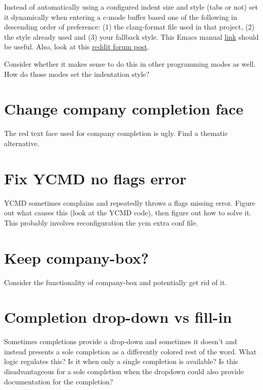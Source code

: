 \documentclass{default}
\begin{document}
Instead of automatically using a configured indent size and style (tabs or not) set it dynamically
when entering a c-mode buffer based one of the following in descending order of preference: (1) the
clang-format file used in that project, (2) the style already used and (3) your fallback style. This
Emacs manual
\href{https://www.gnu.org/software/emacs/manual/html_node/emacs/C-Indent.html#C-Indent}{link} should
be useful. Also, look at this
\href{https://www.reddit.com/r/emacs/comments/7uq9w1/replace_emacs_c_autoformatting_with_clangformat/dtmbq1j?utm_source=share&utm_medium=web2x}{reddit
  forum post}.

Consider whether it makes sense to do this in other programming modes as well. How do those modes
set the indentation style?

\section{Change company completion face}

The red text face used for company completion is ugly. Find a thematic alternative.

\section{Fix YCMD no flags error}

YCMD sometimes complains and repeatedly throws a flags missing error. Figure out what causes this
(look at the YCMD code), then figure out how to solve it. This probably involves reconfiguration the
ycm extra conf file.

\section{Keep company-box?}

Consider the functionality of company-box and potentially get rid of it.

\section{Completion drop-down vs fill-in}

Sometimes completions provide a drop-down and sometimes it doesn't and instead presents a sole
completion as a differently colored rest of the word. What logic regulates this? Is it when only a
single completion is available? Is this disadvantageous for a sole completion when the dropdown
could also provide documentation for the completion?
\end{document}

